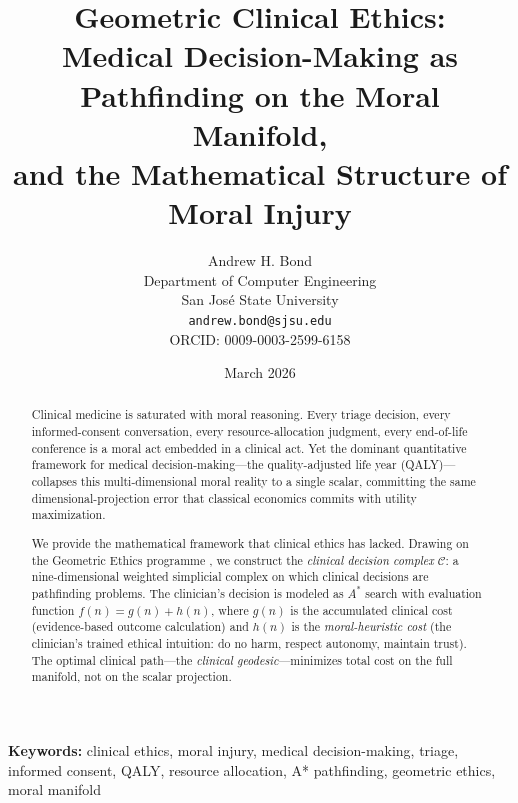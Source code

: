 \documentclass[12pt]{article}
\title{\textbf{Geometric Clinical Ethics:\\Medical Decision-Making as Pathfinding on the Moral Manifold,\\and the Mathematical Structure of Moral Injury}}
\author{Andrew H. Bond\\
Department of Computer Engineering\\
San Jos\'{e} State University\\
\texttt{andrew.bond@sjsu.edu}\\
ORCID: 0009-0003-2599-6158}
\date{March 2026}
\theoremstyle{definition}
\theoremstyle{remark}
\newcommand{\C}{\mathcal{C}}               %
\begin{document}
\maketitle

\noindent\textbf{Keywords:} clinical ethics, moral injury, medical decision-making, triage, informed consent, QALY, resource allocation, A* pathfinding, geometric ethics, moral manifold

\begin{abstract}
Clinical medicine is saturated with moral reasoning.  Every triage decision, every informed-consent conversation, every resource-allocation judgment, every end-of-life conference is a moral act embedded in a clinical act.  Yet the dominant quantitative framework for medical decision-making---the quality-adjusted life year (QALY)---collapses this multi-dimensional moral reality to a single scalar, committing the same dimensional-projection error that classical economics commits with utility maximization.

We provide the mathematical framework that clinical ethics has lacked.  Drawing on the Geometric Ethics programme \cite{bond2026geometric}, we construct the \emph{clinical decision complex} $\C$: a nine-dimensional weighted simplicial complex on which clinical decisions are pathfinding problems.  The clinician's decision is modeled as $A^*$ search with evaluation function $f(n) = g(n) + h(n)$, where $g(n)$ is the accumulated clinical cost (evidence-based outcome calculation) and $h(n)$ is the \emph{moral-heuristic cost} (the clinician's trained ethical intuition: do no harm, respect autonomy, maintain trust).  The optimal clinical path---the \emph{clinical geodesic}---minimizes total cost on the full manifold, not on the scalar projection.


\end{abstract}
\end{document}
